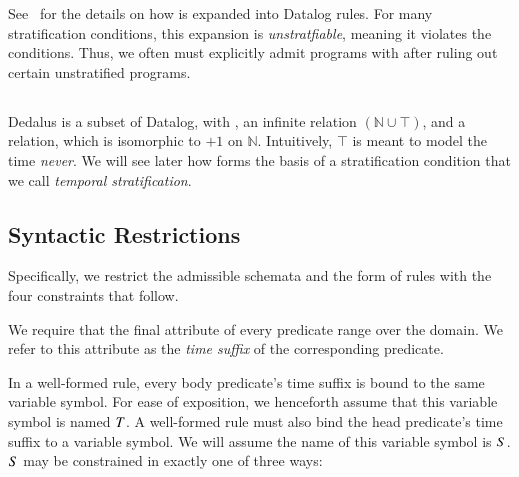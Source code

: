 See~\cite{greedychoice} for the details on how  is expanded into Datalog rules.  For many stratification conditions, this expansion is {\em unstratfiable}, meaning it violates the conditions.  Thus, we often must explicitly admit programs with  after ruling out certain unstratified programs.

\subsection{\lang}
Dedalus is a subset of Datalog, with , an infinite  relation $(\mathbb{N} \cup \top)$, and a  relation, which is isomorphic to $+1$ on $\mathbb{N}$.  Intuitively, $\top$ is meant to model the time {\em never}.  We will see later how  forms the basis of a stratification condition that we call {\em temporal stratification}.

\subsection{Syntactic Restrictions}
\label{sec:syntaxrestrictions}

Specifically, we restrict the admissible schemata and the form of rules with the four constraints that follow.

We require that the final attribute of every \lang predicate range over the  domain.  
We refer to this attribute as the \emph{time suffix} of the corresponding predicate.

%
%
In a well-formed \lang rule, every body predicate's time suffix is bound to the
same variable symbol.  For ease of exposition, we henceforth assume that this
variable symbol is named $\DT$.  A well-formed \lang rule must also bind the head
predicate's time suffix to a variable symbol.  We will assume the name of this
variable symbol is $\DS$.  $\DS$ may be constrained in exactly one of three ways:

